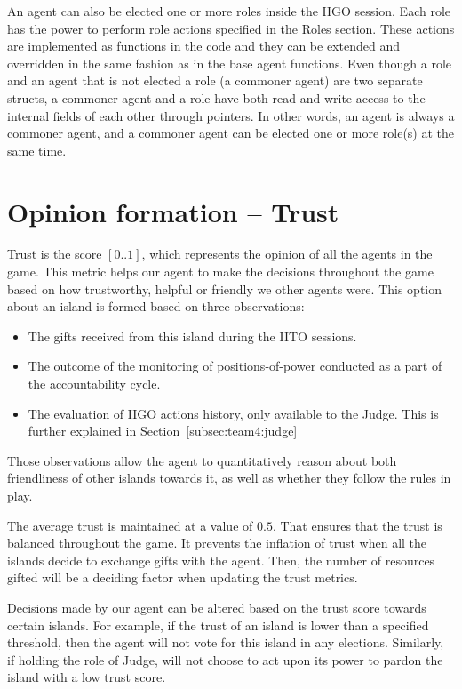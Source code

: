An agent can also be elected one or more roles inside the IIGO session. Each role has the power to perform role actions specified in the Roles section. These actions are implemented as functions in the code and they can be extended and overridden in the same fashion as in the base agent functions. Even though a role and an agent that is not elected a role (a commoner agent) are two separate structs, a commoner agent and a role have both read and write access to the internal fields of each other through pointers. In other words, an agent is always a commoner agent, and a commoner agent can be elected one or more role(s) at the same time.

\section{Opinion formation -- Trust}
\label{sec:team4:trust}
Trust is the score $[0..1]$, which represents the opinion of all the agents in the game. This metric helps our agent to make the decisions throughout the game based on how trustworthy, helpful or friendly we other agents were. This option about an island is formed based on three observations:
\begin{itemize}
    \item The gifts received from this island during the IITO sessions.
    \item The outcome of the monitoring of positions-of-power conducted as a part of the accountability cycle.
    \item The evaluation of IIGO actions history, only available to the Judge. This is further explained in Section~\ref{subsec:team4:judge}
\end{itemize}
Those observations allow the agent to quantitatively reason about both friendliness of other islands towards it, as well as whether they follow the rules in play.

The average trust is maintained at a value of $0.5$. That ensures that the trust is balanced throughout the game. It prevents the inflation of trust when all the islands decide to exchange gifts with the agent. Then, the number of resources gifted will be a deciding factor when updating the trust metrics.

Decisions made by our agent can be altered based on the trust score towards certain islands. For example, if the trust of an island is lower than a specified threshold, then the agent will not vote for this island in any elections. Similarly, if holding the role of Judge, will not choose to act upon its power to pardon the island with a low trust score.

